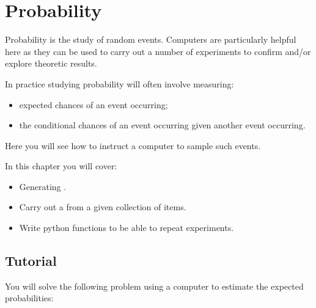 \chapter{Probability}
\label{chp:probability}

Probability is the study of random events. Computers are particularly helpful
here as they can be used to carry out a number of experiments to confirm and/or
explore theoretic results.

In practice studying probability will often involve measuring:
\begin{itemize}
\item 

expected chances of an event occurring;

\item 

the conditional chances of an event occurring given another event
occurring.

\end{itemize}


Here you will see how to instruct a computer to sample such events.



\begin{note}
In this chapter you will cover:
\begin{itemize}
\item 

Generating .

\item 

Carry out a  from a given collection of items.

\item 

Write python functions to be able to repeat experiments.

\end{itemize}
\end{note}




\section{Tutorial}
\label{\detokenize{tools-for-mathematics/06-probability/tutorial/main:tutorial}}\label{\detokenize{tools-for-mathematics/06-probability/tutorial/main::doc}}

You will solve the following problem using a computer to estimate the expected
probabilities:

